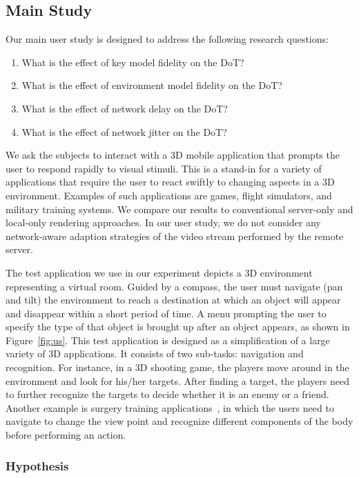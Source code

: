\subsection{Main Study}
\label{sec:hrr:us:ms}

Our main user study is designed to address the following research questions:
\begin{enumerate}
\item
What is the effect of key model fidelity on the DoT?
\item
What is the effect of environment model fidelity on the DoT?
\item
What is the effect of network delay on the DoT?
\item
What is the effect of network jitter on the DoT?
\end{enumerate}

We ask the subjects to interact with a 3D mobile application that prompts the user to respond rapidly to visual stimuli. This is a stand-in for a variety of applications that require the user to react swiftly to changing aspects in a 3D environment. Examples of such applications are games, flight simulators, and military training systems. We compare our results to conventional server-only and local-only rendering approaches. In our user study, we do not consider any network-aware adaption strategies of the video stream performed by the remote server.

The test application we use in our experiment depicts a 3D environment representing a virtual room. Guided by a compass, the user must navigate (pan and tilt) the environment to reach a destination at which an object will appear and disappear within a short period of time.
A menu prompting the user to specify the type of that object is brought up after an object appears, as shown in Figure~\ref{fig:us}.
This test application is designed as a simplification of a large variety of 3D applications. It consists of two sub-tasks: navigation and recognition.
For instance, in a 3D shooting game, the players move around in the environment and look for his/her targets. After finding a target, the players need to further recognize the targets to decide whether it is an enemy or a friend.
Another example is surgery training applications~\cite{cecil2013}, in which the users need to navigate to change the view point and recognize different components of the body before performing an action.

\subsubsection{Hypothesis}
\label{sec:hrr:us:ms:h}

